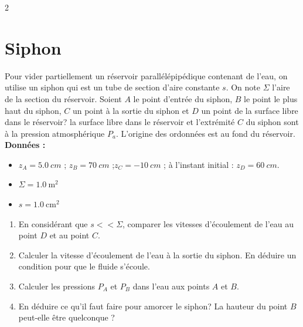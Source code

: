 \documentclass[a4paper,11pt,fleqn]{scrartcl}%
\begin{document}
\begin{multicols}{2}
\section{Siphon}
Pour vider partiellement un réservoir parallélépipédique contenant de l'eau, on utilise un siphon qui est un tube de section d'aire constante $s$. On note $\Sigma$ l'aire de la section du réservoir. Soient $A$ le point d'entrée du siphon, $B$ le point le plus haut du siphon, $C$ un point à la sortie du siphon et $D$ un point de la surface libre dans le réservoir? la surface libre dans le réservoir et l'extrémité $C$ du siphon sont à la pression atmosphérique $P_a$. L'origine des ordonnées est au fond du réservoir.\\
\textbf{Données :}
\begin{itemize}
	\item $z_A=\SI{5,0}{cm}$ ; $z_B=\SI{70}{cm}$ ;$z_C=\SI{-10}{cm}$ ; à l'instant initial : $z_D=\SI{60}{cm}$.
	\item $\Sigma= \SI{1,0}{\meter\squared}$
	\item $s=\SI{1,0}{\centi\meter\squared}$   
\end{itemize}
\begin{enumerate}
	\item En considérant que $s<<\Sigma$, comparer les vitesses d'écoulement de l'eau au point $D$ et au point $C$.
	\item Calculer la vitesse d'écoulement de l'eau à la sortie du siphon. En déduire un condition pour que le fluide s'écoule.
	\item Calculer les pressions $P_A$ et $P_B$ dans l'eau aux points $A$ et $B$.
	\item En déduire ce qu'il faut faire pour amorcer le siphon? La hauteur du point $B$ peut-elle être quelconque ?
\end{enumerate}
\begin{center}
\end{center}
\end{multicols}
\end{document}
